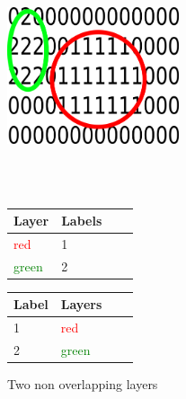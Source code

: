 \begin{figure}[ht]
	\begin{minipage}[b]{\linewidth}
		\centering
		\includegraphics[width=0.45\textwidth]{images/layers3}
	\end{minipage}
	\\\\
	\begin{minipage}[b]{0.48\linewidth}
		\hfill
		\begin{tabular}[b]{|l|l|l|l|}
			\hline
			Layer & Labels \\
			\hline
			\textcolor{red}{red}       & 1 \\
			\textcolor{green}{green}       & 2 \\
			\hline
		\end{tabular}
	\end{minipage}
	\hspace{0.5cm}
	\begin{minipage}[b]{0.5\linewidth}
		\begin{tabular}[b]{|l|l|l|l|}
			\hline
			Label & Layers \\
			\hline
			1       & \textcolor{red}{red} \\
			2       & \textcolor{green}{green} \\
			\hline
		\end{tabular}
		\hfill
	\end{minipage}
	\caption{Two non overlapping layers\label{fig:layer3}}
\end{figure}

